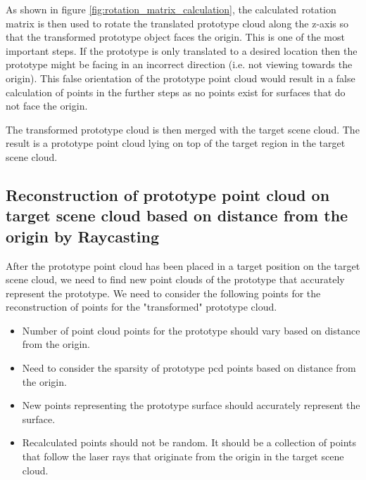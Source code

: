 As shown in figure \ref{fig:rotation_matrix_calculation}, the calculated rotation matrix is then used to rotate the translated prototype cloud along the z-axis so that the transformed prototype object faces the origin. This is one of the most important steps. If the prototype is only translated to a desired location then the prototype might be facing in an incorrect direction (i.e. not viewing towards the origin). This false orientation of the prototype point cloud would result in a false calculation of points in the further steps as no points exist for surfaces that do not face the origin.

The transformed prototype cloud is then merged with the target scene cloud. The result is a prototype point cloud lying on top of the target region in the target scene cloud.


\subsection{Reconstruction of prototype point cloud on target scene cloud based on distance from the origin by Raycasting}

After the prototype point cloud has been placed in a target position on the target scene cloud, we need to find new point clouds of the prototype that accurately represent the prototype. We need to consider the following points for the reconstruction of points for the "transformed" prototype cloud.
\begin{itemize}
    \item Number of point cloud points for the prototype should vary based on distance from the origin.
    \item Need to consider the sparsity of prototype \acrshort{pcd} points based on distance from the origin.
    \item New points representing the prototype surface should accurately represent the surface.
    \item Recalculated points should not be random. It should be a collection of points that follow the laser rays that originate from the origin in the target scene cloud.
\end{itemize}

